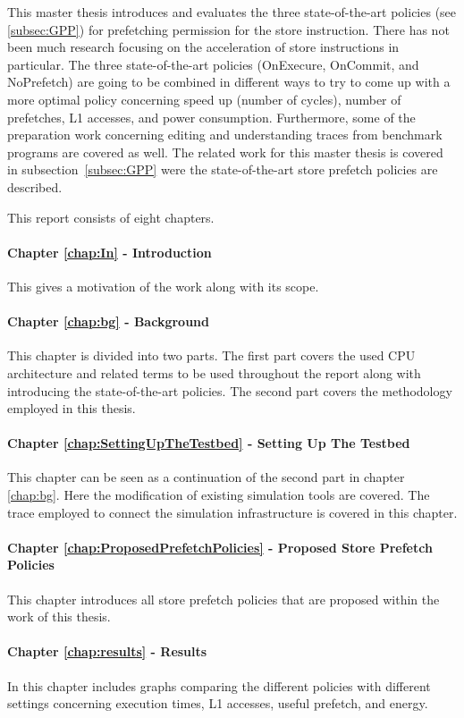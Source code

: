 This master thesis introduces and evaluates the three state-of-the-art policies (see \ref{subsec:GPP}) for prefetching permission for the store instruction. There has not been much research focusing on the acceleration of store instructions in particular. The three state-of-the-art policies (OnExecure, OnCommit, and NoPrefetch) are going to be combined in different ways to try to come up with a more optimal policy concerning speed up (number of cycles), number of prefetches, L1 accesses, and power consumption. Furthermore, some of the preparation work concerning editing and understanding traces from benchmark programs are covered as well. 
The related work for this master thesis is covered in subsection~\ref{subsec:GPP} were the state-of-the-art store prefetch policies are described. 



This report consists of eight chapters. 
\paragraph{Chapter \ref{chap:In} - Introduction} This gives a motivation of the work along with its scope. 
\paragraph{Chapter \ref{chap:bg} - Background} This chapter is divided into two parts. The first part covers
the used CPU architecture and related terms to be used throughout the report along with introducing the state-of-the-art policies. The second part covers the methodology employed in this thesis.
\paragraph{Chapter \ref{chap:SettingUpTheTestbed} - Setting Up The Testbed} This chapter can be seen as a continuation of the
second part in chapter \ref{chap:bg}.  Here the modification of existing simulation tools are covered. The trace employed to connect the simulation infrastructure is covered in this chapter.
\paragraph{Chapter \ref{chap:ProposedPrefetchPolicies} - Proposed Store Prefetch Policies} This chapter introduces all store
 prefetch policies that are proposed within the work of this thesis.
\paragraph{Chapter \ref{chap:results} - Results} In this chapter includes graphs comparing the different
 policies with different settings concerning execution times, L1 accesses, useful prefetch, and energy.
